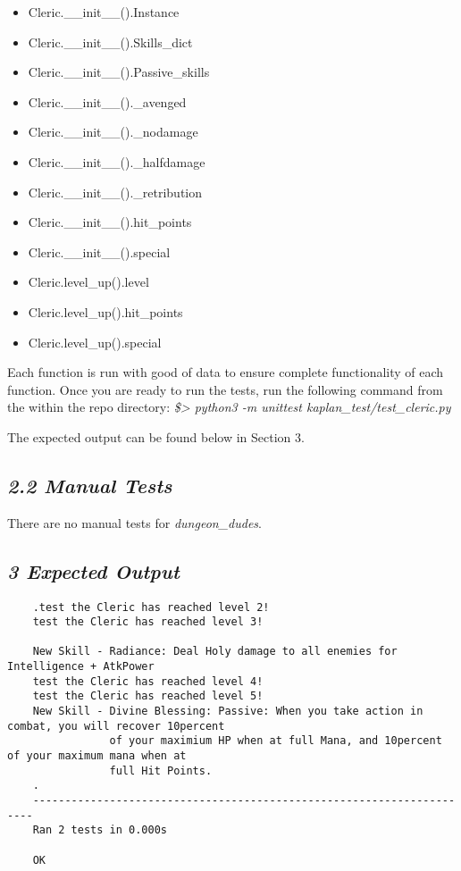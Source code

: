 \documentclass[11pt]{extbook}
\begin{document}
\begin{multicols}{2}
    \begin{itemize}
        \item Cleric.\_\_init\_\_().Instance
        \item Cleric.\_\_init\_\_().Skills\_dict
        \item Cleric.\_\_init\_\_().Passive\_skills
        \item Cleric.\_\_init\_\_().\_avenged
        \item Cleric.\_\_init\_\_().\_nodamage
        \item Cleric.\_\_init\_\_().\_halfdamage
        \item Cleric.\_\_init\_\_().\_retribution
        \item Cleric.\_\_init\_\_().hit\_points
        \item Cleric.\_\_init\_\_().special
        \item Cleric.level\_up().level
        \item Cleric.level\_up().hit\_points
        \item Cleric.level\_up().special

    \end{itemize}
    \end{multicols}

Each function is run with good of data to ensure 
complete functionality of each function. Once you are ready to run the tests, 
run the following command from the within the repo directory: 
\newline
\emph{\$> python3 -m unittest kaplan\_test/test\_cleric.py} \newline 

The expected output can be found below in Section 3.
\newpage
\subsection*{\emph{2.2 Manual Tests}}

There are no manual tests for \emph{dungeon\_dudes}.

\begin{landscape}
\section*{\emph{3 Expected Output}}
\begin{verbatim}
    .test the Cleric has reached level 2!
    test the Cleric has reached level 3!

    New Skill - Radiance: Deal Holy damage to all enemies for Intelligence + AtkPower
    test the Cleric has reached level 4!
    test the Cleric has reached level 5!
    New Skill - Divine Blessing: Passive: When you take action in combat, you will recover 10percent 
                of your maximium HP when at full Mana, and 10percent of your maximum mana when at 
                full Hit Points.
    .
    ----------------------------------------------------------------------
    Ran 2 tests in 0.000s

    OK
\end{verbatim}
\end{landscape}
\end{document}
